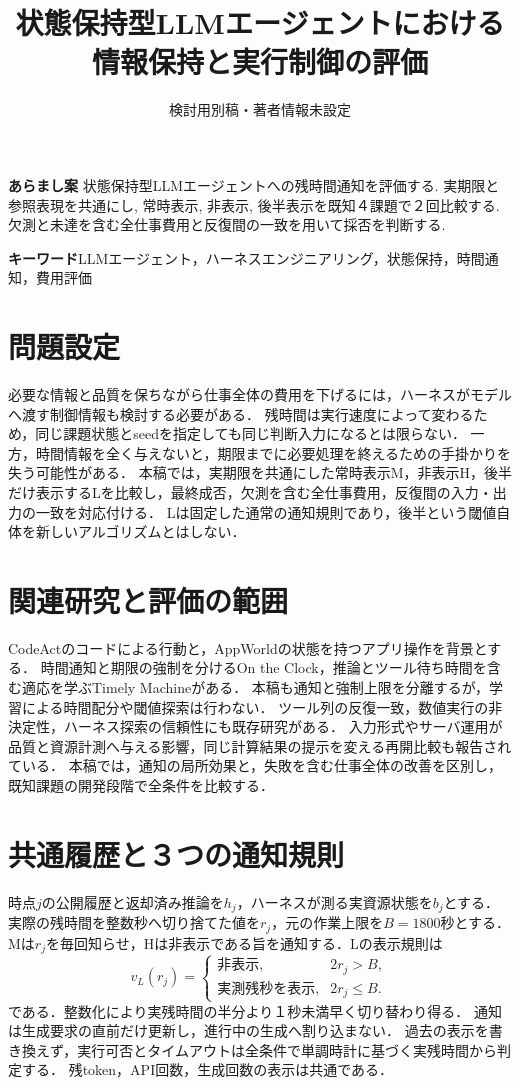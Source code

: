 \documentclass[uplatex,a4paper,twocolumn,10pt]{jsarticle}
\title{状態保持型LLMエージェントにおける\newline 情報保持と実行制御の評価}
\author{検討用別稿・著者情報未設定}
\date{}
\begin{document}
\raggedbottom
\maketitle
\noindent\textbf{あらまし案}\quad
状態保持型LLMエージェントへの残時間通知を評価する. 実期限と参照表現を共通にし, 常時表示, 非表示, 後半表示を既知４課題で２回比較する. 欠測と未達を含む全仕事費用と反復間の一致を用いて採否を判断する.

\noindent\textbf{キーワード}\quad LLMエージェント，ハーネスエンジニアリング，状態保持，時間通知，費用評価

\section{問題設定}
必要な情報と品質を保ちながら仕事全体の費用を下げるには，ハーネスがモデルへ渡す制御情報も検討する必要がある．
残時間は実行速度によって変わるため，同じ課題状態とseedを指定しても同じ判断入力になるとは限らない．
一方，時間情報を全く与えないと，期限までに必要処理を終えるための手掛かりを失う可能性がある．
本稿では，実期限を共通にした常時表示M，非表示H，後半だけ表示するLを比較し，最終成否，欠測を含む全仕事費用，反復間の入力・出力の一致を対応付ける．
Lは固定した通常の通知規則であり，後半という閾値自体を新しいアルゴリズムとはしない．

\section{関連研究と評価の範囲}
CodeAct\cite{codeact}のコードによる行動と，AppWorld\cite{appworld}の状態を持つアプリ操作を背景とする．
時間通知と期限の強制を分けるOn the Clock\cite{clock}，推論とツール待ち時間を含む適応を学ぶTimely Machine\cite{timely}がある．
本稿も通知と強制上限を分離するが，学習による時間配分や閾値探索は行わない．
ツール列の反復一致\cite{consistency}，数値実行の非決定性\cite{nondeterminism}，ハーネス探索の信頼性\cite{beyondprompts}にも既存研究がある．
入力形式やサーバ運用が品質と資源計測へ与える影響\cite{localprotocol}，同じ計算結果の提示を変える再開比較\cite{delivery}も報告されている．
本稿では，通知の局所効果と，失敗を含む仕事全体の改善を区別し，既知課題の開発段階で全条件を比較する．

\section{共通履歴と３つの通知規則}
時点$j$の公開履歴と返却済み推論を$h_j$，ハーネスが測る実資源状態を$b_j$とする．
実際の残時間を整数秒へ切り捨てた値を$r_j$，元の作業上限を$B=1800$秒とする．
Mは$r_j$を毎回知らせ，Hは非表示である旨を通知する．Lの表示規則は
\begin{equation}
v_L(r_j)=\begin{cases}
\text{非表示},&2r_j>B,\\
\text{実測残秒を表示},&2r_j\leq B.
\end{cases}
\end{equation}
である．整数化により実残時間の半分より１秒未満早く切り替わり得る．
通知は生成要求の直前だけ更新し，進行中の生成へ割り込まない．
過去の表示を書き換えず，実行可否とタイムアウトは全条件で単調時計に基づく実残時間から判定する．
残token，API回数，生成回数の表示は共通である．
\end{document}
